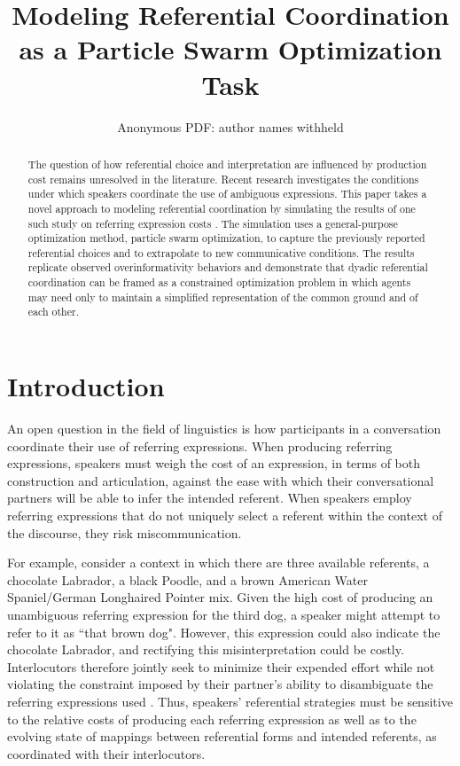 \documentclass[a4paper,11pt]{article}
\title{Modeling Referential Coordination as a Particle Swarm Optimization Task}
\author{ Anonymous PDF:  author names withheld\\}
\date{}
\begin{document}
\maketitle
\begin{abstract}
The question of how referential choice and interpretation are influenced by production cost remains unresolved in the literature. Recent research \cite{rohde2012,degen2012,frank2012} investigates the conditions under which speakers coordinate the use of ambiguous expressions. This paper takes a novel approach to modeling referential coordination by simulating the results of one such study on referring expression costs \cite{rohde2012}.  The simulation uses a general-purpose optimization method, particle swarm optimization, to capture the previously reported referential choices and to extrapolate to new communicative conditions.  The results replicate observed overinformativity behaviors \cite{brennan1996} and demonstrate that dyadic referential coordination can be framed as a constrained optimization problem in which agents may need only to maintain a simplified representation of the common ground and of each other.
\end{abstract}

\section{Introduction}
An open question in the field of linguistics is how participants in a conversation coordinate their use of referring expressions. When producing referring expressions, speakers must weigh the cost of an expression, in terms of both construction and articulation, against the ease with which their conversational partners will be able to infer the intended referent. When speakers employ referring expressions that do not uniquely select a referent within the context of the discourse, they risk miscommunication.

For example, consider a context in which there are three available referents, a chocolate Labrador, a black Poodle, and a brown American Water Spaniel/German Longhaired Pointer mix. Given the high cost of producing an unambiguous referring expression for the third dog, a speaker might attempt to refer to it as ``that brown dog". However, this expression could also indicate the chocolate Labrador, and rectifying this misinterpretation could be costly. Interlocutors therefore jointly seek to minimize their expended effort while not violating the constraint imposed by their partner's ability to disambiguate the referring expressions used \cite{benz2005}. Thus, speakers' referential strategies must be sensitive to the relative costs of producing each referring expression as well as to the evolving state of mappings between referential forms and intended referents, as coordinated with their interlocutors. 
\end{document}
